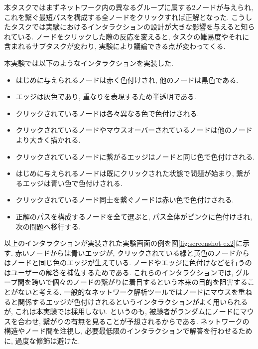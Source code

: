 \documentclass{kuee}
\begin{document}
本タスクではまずネットワーク内の異なるグループに属する2ノードが与えられ, これを繋ぐ最短パスを構成する全ノードをクリックすれば正解となった.
こうしたタスクでは実験におけるインタラクションの設計が大きな影響を与えると知られている\cite{yoghourdjian2018exploring}.
ノードをクリックした際の反応を変えると, タスクの難易度やそれに含まれるサブタスクが変わり, 実験により議論できる点が変わってくる.

本実験では以下のようなインタラクションを実装した.
\begin{itemize}
  \item はじめに与えられるノードは赤く色付けされ, 他のノードは黒色である.
  \item エッジは灰色であり, 重なりを表現するため半透明である.
  \item クリックされているノードは各々異なる色で色付けされる.
  \item クリックされているノードやマウスオーバーされているノードは他のノードより大きく描かれる.
  \item クリックされているノードに繋がるエッジはノードと同じ色で色付けされる.
  \item はじめに与えられるノードは既にクリックされた状態で問題が始まり, 繋がるエッジは青い色で色付けされる.
  \item クリックされているノード同士を繋ぐノードは赤い色で色付けされる.
  \item 正解のパスを構成するノードを全て選ぶと, パス全体がピンクに色付けされ, 次の問題へ移行する.
\end{itemize}
以上のインタラクションが実装された実験画面の例を図\ref{fig:screenshot-ex2}に示す.
赤いノードからは青いエッジが, クリックされている緑と黄色のノードからはノードと同じ色のエッジが生えている.
ノードやエッジに色付けなどを行うのはユーザーの解答を補佐するためである.
これらのインタラクションでは, グループ間を跨いで個々のノードの繋がりに着目するという本来の目的を阻害することがないと考える.
一般的なネットワーク解析ツールではノードにマウスを重ねると関係するエッジが色付けされるというインタラクションがよく用いられるが, これは本実験では採用しない.
というのも, 被験者がランダムにノードにマウスを合わせ, 繋がりの有無を見ることが予想されるからである.
ネットワークの構造やノード間を注視し, 必要最低限のインタラクションで解答を行わせるために, 過度な修飾は避けた.
\end{document}
